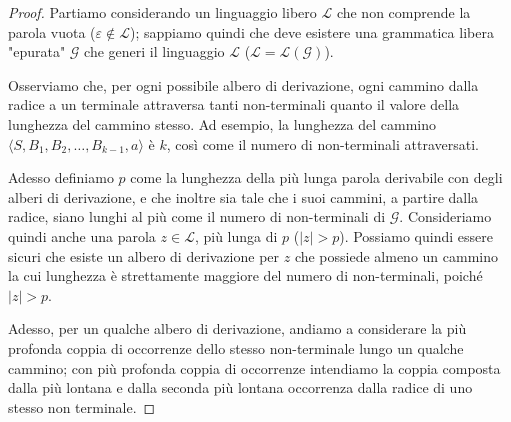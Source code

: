 \documentclass[class=book, crop=false, oneside, 12pt]{standalone}
\begin{document}
\begin{proof}
  Partiamo considerando un linguaggio libero \(\mathcal{L}\) che non comprende la parola vuota (\(\varepsilon \notin \mathcal{L}\)); sappiamo quindi che deve esistere una grammatica libera "epurata" \(\mathcal{G}\) che generi il linguaggio \(\mathcal{L}\) (\(\mathcal{L} = \mathcal{L(G)}\)).

  Osserviamo che, per ogni possibile albero di derivazione, ogni cammino dalla radice a un terminale attraversa tanti non-terminali quanto il valore della lunghezza del cammino stesso. Ad esempio, la lunghezza del cammino \(\langle S, B_1, B_2, \ldots, B_{k-1}, a \rangle\) è \(k\), così come il numero di non-terminali attraversati.

  Adesso definiamo \(p\) come la lunghezza della più lunga parola derivabile con degli alberi di derivazione, e che inoltre sia tale che i suoi cammini, a partire dalla radice, siano lunghi al più come il numero di non-terminali di \(\mathcal{G}\). Consideriamo quindi anche una parola \(z \in \mathcal{L}\), più lunga di \(p\) (\(|z| > p\)). Possiamo quindi essere sicuri che esiste un albero di derivazione per \(z\) che possiede almeno un cammino la cui lunghezza è strettamente maggiore del numero di non-terminali, poiché \(|z| >p\).

  Adesso, per un qualche albero di derivazione, andiamo a considerare la più profonda coppia di occorrenze dello stesso non-terminale lungo un qualche cammino; con più profonda coppia di occorrenze intendiamo la coppia composta dalla più lontana e dalla seconda più lontana occorrenza dalla radice di uno stesso non terminale.


\end{proof}
\end{document}
